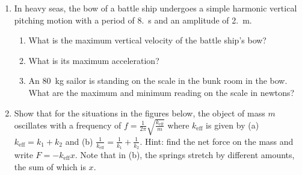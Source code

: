 \documentclass{../../oss-apphys}
\begin{document}
\begin{enumerate}[leftmargin=15pt]
%  

\item In heavy seas, the bow of a battle ship undergoes a simple harmonic
  vertical pitching motion with a period of \SI{8.}{\second} and an amplitude
  of \SI{2.}{\metre}.
  \begin{enumerate}[itemsep=.8in,topsep=0pt,leftmargin=15pt]
  \item What is the maximum vertical velocity of the battle ship's bow?
  \item What is its maximum acceleration?
  \item An \SI{80}{\kilo\gram} sailor is standing on the scale in the bunk room
    in the bow. What are the maximum and minimum reading on the scale in
    newtons?
    \vspace{.8in}
  \end{enumerate}

\item Show that for the situations in the figures below, the object of mass
  $m$ oscillates with a frequency of
  $\displaystyle f=\frac{1}{2\pi}\sqrt{\frac{k_\mathrm{eff}}{m}}$
  where $k_\mathrm{eff}$ is given by (a) $k_\mathrm{eff}=k_1+k_2$ and (b)
  $\displaystyle\frac{1}{k_\mathrm{eff}}=\frac{1}{k_1}+\frac{1}{k_2}$. Hint:
  find the net force on the mass and write $F=-k_\mathrm{eff}x$. Note that in
  (b), the springs stretch by different amounts, the sum of which is $x$.
  

\end{enumerate}
\end{document}
